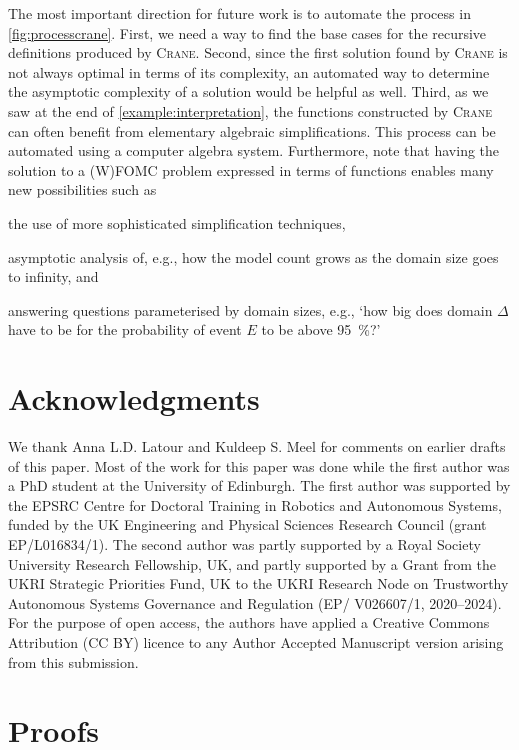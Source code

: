 \documentclass{article}
\begin{document}
The most important direction for future work is to automate the process in
\cref{fig:processcrane}. First, we need a way to find the base cases for the
recursive definitions produced by \textsc{Crane}. Second, since the first
solution found by \textsc{Crane} is not always optimal in terms of its
complexity, an automated way to determine the asymptotic complexity of a
solution would be helpful as well. Third, as we saw at the end of
\cref{example:interpretation}, the functions constructed by \textsc{Crane} can
often benefit from elementary algebraic simplifications. This process can be
automated using a computer algebra system. Furthermore, note that having the
solution to a (W)FOMC problem expressed in terms of functions enables many new
possibilities such as
\begin{enumerate*}[label=(\roman*)]
  \item the use of more sophisticated simplification techniques,
  \item asymptotic analysis of, e.g., how the model count grows as the domain
  size goes to infinity, and
  \item answering questions parameterised by domain sizes, e.g., `how big does
  domain $\Delta$ have to be for the probability of event $E$ to be above
  \SI{95}{\percent}?'
\end{enumerate*}

\section*{Acknowledgments}

We thank Anna L.D. Latour and Kuldeep S. Meel for comments on earlier drafts of
this paper. Most of the work for this paper was done while the first author was
a PhD student at the University of Edinburgh. The first author was supported by
the EPSRC Centre for Doctoral Training in Robotics and Autonomous Systems,
funded by the UK Engineering and Physical Sciences Research Council (grant
EP/L016834/1). The second author was partly supported by a Royal Society
University Research Fellowship, UK, and partly supported by a Grant from the
UKRI Strategic Priorities Fund, UK to the UKRI Research Node on Trustworthy
Autonomous Systems Governance and Regulation (EP/ V026607/1, 2020–2024). For the
purpose of open access, the authors have applied a Creative Commons Attribution
(CC BY) licence to any Author Accepted Manuscript version arising from this
submission.

\appendix
\section{Proofs}\label{sec:proofs}
\end{document}
